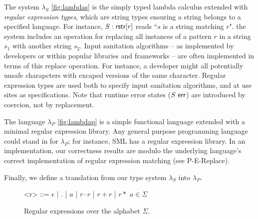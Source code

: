 \documentclass{acm_proc_article-sp}
\theoremstyle{definition}
\newcommand{\lambdas}{\lambda_S}
\newcommand{\lambdap}{\lambda_P}
\newcommand{\err}{\ {\sf err}}
\begin{document}
The system $\lambdas$ \ref{fig:lambdas} is the simply typed lambda calculus extended with \emph{regular expression types}, which are string
types ensuring a string belongs to a specified language. For instance, 
$S : {\sf rstr}[r]$ reads ``$s$ is a string matching $r$".
the system includes an operation for replacing all instances of a pattern $r$ in a string $s_1$ with another string $s_2$. 
Input sanitation algorithms -- as implemented by developers or within popular libraries and frameworks -- are often implemented in terms of this replace operation.
For instance, a developer might all potentially unsafe charapcters with excaped versions of the same character.
Regular expression types are used both to specify input sanitation algorithms, and at use sites as specifications.
Note that runtime error states ($S \err$) are introduced by coercion, not by replacement. 

The language $\lambdap$ \ref{fig:lambdap} is a simple functional language extended with a minimal regular expression library.
Any general purpose programming language could stand in for $\lambdap$; for instance, SML has a regular expression library.
In an implementation, our correctness results are modulo the underlying language's correct implementation of regular expression matching (see P-E-Replace).

Finally, we define a translation from our type system $\lambdas$ into $\lambdap$.


\renewcommand{\grammarlabel}[2]{#1\hfill#2}

\begin{figure}[h]
\begin{grammar}
<r> ::= $\epsilon$ | $.$ | $a$ | $r \cdot r$ | $r + r$ | $r*$ \hfill $a \in \Sigma$

\caption{Regular expressions over the alphabet $\Sigma$.}
\end{grammar}
\end{figure}
\end{document}

